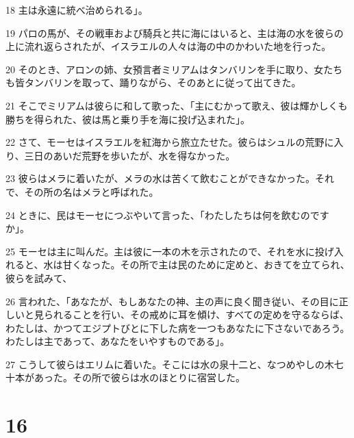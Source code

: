 \par 18 主は永遠に統べ治められる」。
\par 19 パロの馬が、その戦車および騎兵と共に海にはいると、主は海の水を彼らの上に流れ返らされたが、イスラエルの人々は海の中のかわいた地を行った。
\par 20 そのとき、アロンの姉、女預言者ミリアムはタンバリンを手に取り、女たちも皆タンバリンを取って、踊りながら、そのあとに従って出てきた。
\par 21 そこでミリアムは彼らに和して歌った、「主にむかって歌え、彼は輝かしくも勝ちを得られた、彼は馬と乗り手を海に投げ込まれた」。
\par 22 さて、モーセはイスラエルを紅海から旅立たせた。彼らはシュルの荒野に入り、三日のあいだ荒野を歩いたが、水を得なかった。
\par 23 彼らはメラに着いたが、メラの水は苦くて飲むことができなかった。それで、その所の名はメラと呼ばれた。
\par 24 ときに、民はモーセにつぶやいて言った、「わたしたちは何を飲むのですか」。
\par 25 モーセは主に叫んだ。主は彼に一本の木を示されたので、それを水に投げ入れると、水は甘くなった。その所で主は民のために定めと、おきてを立てられ、彼らを試みて、
\par 26 言われた、「あなたが、もしあなたの神、主の声に良く聞き従い、その目に正しいと見られることを行い、その戒めに耳を傾け、すべての定めを守るならば、わたしは、かつてエジプトびとに下した病を一つもあなたに下さないであろう。わたしは主であって、あなたをいやすものである」。
\par 27 こうして彼らはエリムに着いた。そこには水の泉十二と、なつめやしの木七十本があった。その所で彼らは水のほとりに宿営した。

\chapter{16}


